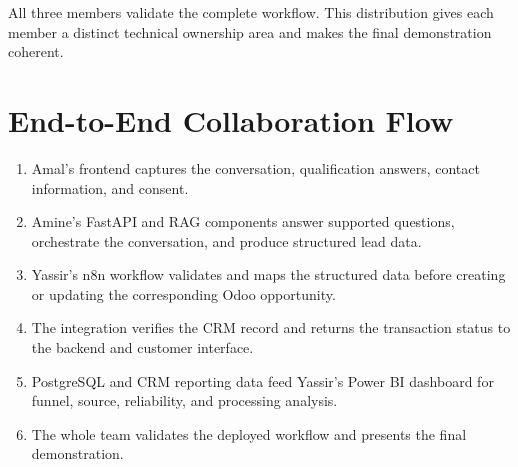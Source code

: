 \documentclass[11pt,a4paper]{article}
\begin{document}
All three members validate the complete workflow. This distribution gives each member a distinct technical ownership area and makes the final demonstration coherent.

\section{End-to-End Collaboration Flow}

\begin{enumerate}[leftmargin=1.8em,itemsep=0.5em]
  \item Amal's frontend captures the conversation, qualification answers, contact information, and consent.
  \item Amine's FastAPI and RAG components answer supported questions, orchestrate the conversation, and produce structured lead data.
  \item Yassir's n8n workflow validates and maps the structured data before creating or updating the corresponding Odoo opportunity.
  \item The integration verifies the CRM record and returns the transaction status to the backend and customer interface.
  \item PostgreSQL and CRM reporting data feed Yassir's Power BI dashboard for funnel, source, reliability, and processing analysis.
  \item The whole team validates the deployed workflow and presents the final demonstration.
\end{enumerate}
\end{document}
